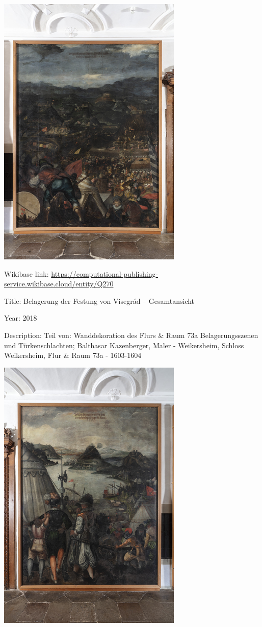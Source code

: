 \documentclass[
  letterpaper,
]{book}
\begin{document}
\includegraphics{paintings_files/figure-pdf/cell-3-output-30.png}

Wikibase link:
\url{https://computational-publishing-service.wikibase.cloud/entity/Q270}

Title: Belagerung der Festung von Visegrád -- Gesamtansicht

Year: 2018

Description: Teil von: Wanddekoration des Flurs \& Raum 73a
Belagerungsszenen und Türkenschlachten; Balthasar Kazenberger, Maler -
Weikersheim, Schloss Weikersheim, Flur \& Raum 73a - 1603-1604

\includegraphics{paintings_files/figure-pdf/cell-3-output-32.png}
\end{document}
